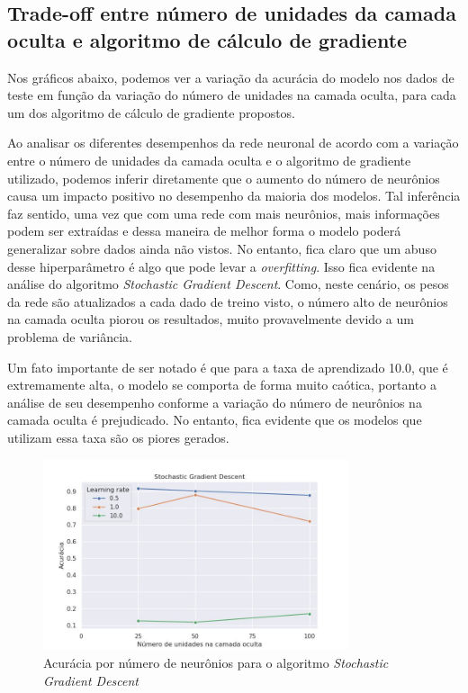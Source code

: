 \documentclass{article}
\begin{document}
\subsection{Trade-off entre número de unidades da camada oculta e algoritmo de cálculo de gradiente}

Nos gráficos abaixo, podemos ver a variação da acurácia do modelo nos dados de teste em função da variação do número de unidades na camada oculta, para cada um dos algoritmo de cálculo de gradiente propostos.

Ao analisar os diferentes desempenhos da rede neuronal de acordo com a variação entre o número de unidades da camada oculta e o algoritmo de gradiente utilizado, podemos inferir diretamente que o aumento do número de neurônios
causa um impacto positivo no desempenho da maioria dos modelos. Tal inferência faz sentido, uma vez que com uma rede com mais neurônios, mais informações podem ser extraídas e dessa maneira de melhor forma o modelo poderá generalizar sobre
dados ainda não vistos. No entanto, fica claro que um abuso desse hiperparâmetro é algo que pode levar a \textit{overfitting}. Isso fica evidente na análise do algoritmo \textit{Stochastic Gradient Descent}. Como, neste cenário, os pesos da rede são atualizados a cada dado de treino visto, o número alto de neurônios na camada oculta piorou os resultados, muito provavelmente devido
a um problema de variância.

Um fato importante de ser notado é que para a taxa de aprendizado 10.0, que é extremamente alta, o modelo se comporta de forma muito caótica, portanto a análise de seu desempenho conforme a variação do número de neurônios na
camada oculta é prejudicado. No entanto, fica evidente que os modelos que utilizam essa taxa são os piores gerados.

\begin{figure}[H]
    \centering
    \includegraphics[width=0.8\textwidth]{images/tradeoff/SGD.jpg}
    \caption{Acurácia por número de neurônios para o algoritmo \textit{Stochastic Gradient Descent}}
\end{figure}
\end{document}
